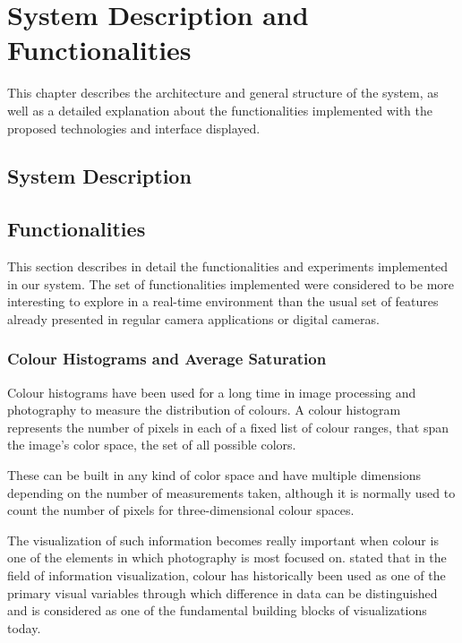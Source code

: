 
\chapter{System Description and Functionalities}
\label{cha:system}
This chapter describes the architecture and general structure of the system, as well as a detailed explanation about the functionalities implemented with the proposed technologies and interface displayed.

\section{System Description}
\label{sec:system_description}


\section{Functionalities}
\label{sec:functionalities}

This section describes in detail the functionalities and experiments implemented in our system. The set of functionalities implemented were considered to be more interesting to explore in a real-time environment than the usual set of features already presented in regular camera applications or digital cameras.

\subsection{Colour Histograms and Average Saturation}
\label{sub:histograms}

Colour histograms have been used for a long time in image processing and photography to measure the distribution of colours. A colour histogram represents the number of pixels in each of a fixed list of colour ranges, that span the image's color space, the set of all possible colors.

These can be built in any kind of color space and have multiple dimensions depending on the number of measurements taken, although it is normally used to count the number of pixels for three-dimensional colour spaces.

The visualization of such information becomes really important when colour is one of the elements in which photography is most focused on. \citeauthor{bertin1983semiology} stated that in the field of information visualization, colour has historically been used as one of the primary visual variables through which difference in data can be distinguished and is considered as one of the fundamental building blocks of visualizations today.

